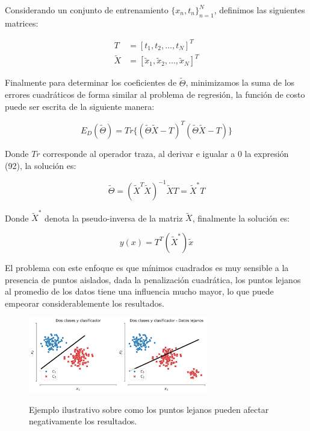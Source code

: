 Considerando un conjunto de entrenamiento $\{x_n,t_n\}_{n=1}^N$, definimos las siguientes matrices:

\begin{align}
    T &= [t_1, t_2,\ldots, t_N]^T\\
    \tilde{X} &= [\tilde{x}_1, \tilde{x}_2, \ldots, \tilde{x}_N ]^T
\end{align}

Finalmente para determinar los coeficientes de $\tilde{\Theta}$, minimizamos la suma de los errores cuadráticos de forma similar al problema de regresión, la función de costo puede ser escrita de la siguiente manera:

\begin{equation}
    E_D(\tilde{\Theta}) = Tr\{(\tilde{\Theta}\tilde{X}-T)^T(\tilde{\Theta}\tilde{X}-T)\}
\end{equation}

Donde $Tr$ corresponde al operador traza, al derivar e igualar a 0 la expresión (92), la solución es:

\begin{equation}
    \tilde{\Theta} = (\tilde{X}^T\tilde{X})^{-1}\tilde{X}T = \tilde{X}^*T
\end{equation}

Donde $\tilde{X}^*$ denota la pseudo-inversa de la matriz $\tilde{X}$, finalmente la solución es:

\begin{equation}
y(x) = T^T(\tilde{X}^*)\tilde{x}
\end{equation}

El problema con este enfoque es que mínimos cuadrados es muy sensible a la presencia de puntos aislados, dada la penalización cuadrática, los puntos lejanos al promedio de los datos tiene una influencia mucho mayor, lo que puede empeorar considerablemente los resultados.


\begin{figure}[H]
    \centering
    \includegraphics[width=0.7\textwidth]{img/cap2_dosclases_clasificador.pdf}\\
    \caption{Ejemplo ilustrativo sobre como los puntos lejanos pueden afectar negativamente los resultados.}
    \label{fig:clasif_mse}
\end{figure}

